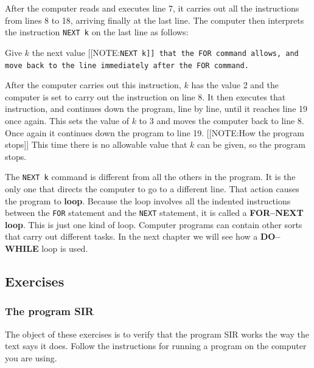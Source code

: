 After the computer reads and executes line 7, it carries out all the
instructions from lines 8 to 18, arriving finally at the last line.
The computer then interprets the instruction {\tt NEXT k} on the last
line as follows:
\begin{center}
	Give $k$ the next value 
	[[NOTE:\tt NEXT k]]
		that the {\tt FOR} command allows, and \\
	move back to the line immediately after the {\tt FOR}
		command.
\end{center}
After the computer carries out this instruction, $k$ has the value 2
and the computer is set to carry out the instruction on line 8.  It
then executes that instruction, and continues down the program, line
by line, until it reaches line 19 once again.  This sets the value of
$k$ to 3 and moves the computer back to line 8.  Once again it
continues down the program to line 19.  [[NOTE:How the program stops]]
This time there is no allowable value that $k$ can be given, so the
program stops.

The {\tt NEXT k} command is different from all the others in the
program.  It is the only one that directs the computer to go to a
different line.  That action causes the program to {\bf loop}.
Because the loop involves all the indented instructions between the
{\tt FOR} statement and the {\tt NEXT} statement, it is called a {\bf
  FOR--NEXT loop}. This is just one kind of
loop.  Computer programs can contain other sorts that carry out
different tasks.  In the next chapter we will see how a {\bf
  DO--WHILE} loop is used.



\subsection{Exercises}
\label{subsec:exercises}

\subsubsection{The program SIR}
\label{subsubsec:the-program-sir}

The object of these exercises is to verify that the program SIR works
the way the text says it does.  Follow the instructions for running a
program on the computer you are using.



